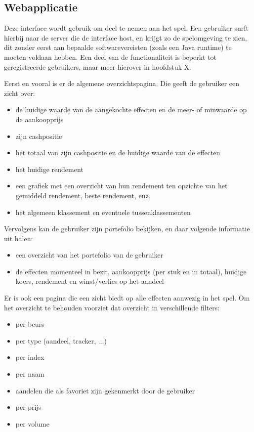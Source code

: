 \subsection{Webapplicatie}

Deze interface wordt gebruik om deel te nemen aan het spel. Een gebruiker surft hierbij naar de server die de interface host, en krijgt zo de spelomgeving te zien, dit zonder eerst aan bepaalde softwarevereisten (zoals een Java runtime) te moeten voldaan hebben. Een deel van de functionaliteit is beperkt tot geregistreerde gebruikers, maar meer hierover in hoofdstuk X.

Eerst en vooral is er de algemene overzichtspagina. Die geeft de gebruiker een zicht over:
\begin{itemize}
\item{de huidige waarde van de aangekochte effecten en de meer- of minwaarde op de aankoopprijs}
\item{zijn cashpositie}
\item{het totaal van zijn cashpositie en de huidige waarde van de effecten}
\item{het huidige rendement}
\item{een grafiek met een overzicht van hun rendement ten opzichte van het gemiddeld rendement, beste rendement, enz.}
\item{het algemeen klassement en eventuele tussenklassementen}
\end{itemize}

Vervolgens kan de gebruiker zijn portefolio bekijken, en daar volgende informatie uit halen:
\begin{itemize}
\item{een overzicht van het portefolio van de gebruiker}
\item{de effecten momenteel in bezit, aankoopprijs (per stuk en in totaal), huidige koers, rendement en winst/verlies op het aandeel}
\end{itemize}

Er is ook een pagina die een zicht biedt op alle effecten aanwezig in het spel. Om het overzicht te behouden voorziet dat overzicht in verschillende filters:
\begin{itemize}
\item{per beurs}
\item{per type (aandeel, tracker, ...)}
\item{per index}
\item{per naam}
\item{aandelen die als favoriet zijn gekenmerkt door de gebruiker}
\item{per prijs}
\item{per volume}
\end{itemize}

